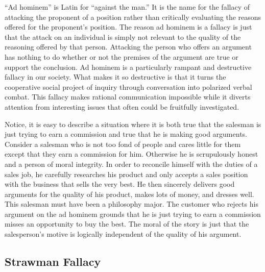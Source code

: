 “Ad hominem” is Latin for “against the man.” It is the name for the fallacy of attacking the proponent of a position rather than critically evaluating the reasons offered for the proponent’s position. The reason ad hominem is a fallacy is just that the attack on an individual is simply not relevant to the quality of the reasoning offered by that person. Attacking the person who offers an argument has nothing to do whether or not the premises of the argument are true or support the conclusion. Ad hominem is a particularly rampant and destructive fallacy in our society. What makes it so destructive is that it turns the cooperative social project of inquiry through conversation into polarized verbal combat. This fallacy makes rational communication impossible while it diverts attention from interesting issues that often could be fruitfully investigated.


Notice, it is easy to describe a situation where it is both true that the salesman is just trying to earn a commission and true that he is making good arguments. Consider a salesman who is not too fond of people and cares little for them except that they earn a commission for him. Otherwise he is scrupulously honest and a person of moral integrity. In order to reconcile himself with the duties of a sales job, he carefully researches his product and only accepts a sales position with the business that sells the very best. He then sincerely delivers good arguments for the quality of his product, makes lots of money, and dresses well. This salesman must have been a philosophy major. The customer who rejects his argument on the ad hominem grounds that he is just trying to earn a commission misses an opportunity to buy the best. The moral of the story is just that the salesperson’s motive is logically independent of the quality of his argument.
\subsection{Strawman Fallacy}

